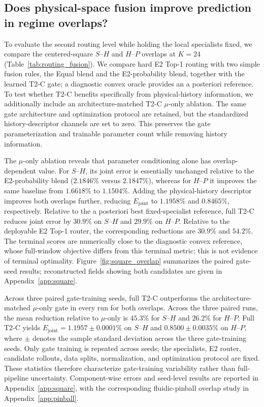 \documentclass{article}
\begin{document}
\subsection{Does physical-space fusion improve prediction in regime overlaps?}
To evaluate the second routing level while holding the local specialists fixed, we compare the centered-square $S$--$H$ and $H$--$P$ overlaps at $K=24$ (Table~\ref{tab:routing_fusion}). We compare hard E2 Top-1 routing with two simple fusion rules, the Equal blend and the E2-probability blend, together with the learned T2-C gate; a diagnostic convex oracle provides an a posteriori reference. To test whether T2-C benefits specifically from physical-history information, we additionally include an architecture-matched T2-C $\mu$-only ablation. The same gate architecture and optimization protocol are retained, but the standardized history-descriptor channels are set to zero. This preserves the gate parameterization and trainable parameter count while removing history information.


The $\mu$-only ablation reveals that parameter conditioning alone has overlap-dependent value. For $S$--$H$, its joint error is essentially unchanged relative to the E2-probability blend ($2.1846\%$ versus $2.1847\%$), whereas for $H$--$P$ it improves the same baseline from $1.6618\%$ to $1.1504\%$. Adding the physical-history descriptor improves both overlaps further, reducing $E_{\mathrm{joint}}$ to $1.1958\%$ and $0.8465\%$, respectively. Relative to the a posteriori best fixed-specialist reference, full T2-C reduces joint error by $30.9\%$ on $S$--$H$ and $29.9\%$ on $H$--$P$. Relative to the deployable E2 Top-1 router, the corresponding reductions are $30.9\%$ and $54.2\%$. The terminal scores are numerically close to the diagnostic convex reference, whose full-window objective differs from this terminal metric; this is not evidence of terminal optimality. Figure~\ref{fig:square_overlap} summarizes the paired gate-seed results; reconstructed fields showing both candidates are given in Appendix~\ref{app:square}.

Across three paired gate-training seeds, full T2-C outperforms the architecture-matched $\mu$-only gate in every run for both overlaps.
Across the three paired runs, the mean reduction relative to $\mu$-only is $45.3\%$ for $S$--$H$ and $26.2\%$ for $H$--$P$. Full T2-C yields
$E_{\mathrm{joint}}=1.1957\pm0.0001\%$ on $S$--$H$ and $0.8500\pm0.0035\%$ on $H$--$P$, where $\pm$ denotes the sample standard
deviation across the three gate-training seeds. Only gate training is repeated across seeds; the specialists, E2 router, candidate rollouts, data splits, normalization, and optimization protocol are fixed. These statistics therefore characterize gate-training variability rather than full-pipeline uncertainty. Component-wise errors and seed-level results are reported in Appendix~\ref{app:square}, with the corresponding fluidic-pinball overlap study in Appendix~\ref{app:pinball}.
\end{document}
